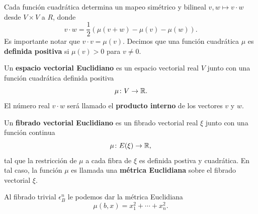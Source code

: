 Cada función cuadrática determina un mapeo simétrico y bilineal $v,w \mapsto v \cdot w$ desde $V \times V$ a $R$, donde
\[ v \cdot w = \frac{1}{2}(\mu(v + w) - \mu(v) - \mu(w)). \]
Es importante notar que $v \cdot v = \mu(v)$. Decimos que una función cuadrática $\mu$ es \textbf{definida positiva} si $\mu(v) > 0$ para $v \neq 0$.

\begin{definition}
	Un \textbf{espacio vectorial Euclidiano} es un espacio vectorial real $V$ junto con una función cuadrática definida positiva
	\[ \mu \colon V \to \mathbb{R}. \]
	El número real $v \cdot w$ será llamado el \textbf{producto interno} de los vectores $v$ y $w$.
\end{definition}

\begin{definition}
	Un \textbf{fibrado vectorial Euclidiano} es un fibrado vectorial real $\xi$ junto con una función continua
	\[ \mu \colon E(\xi) \to \mathbb{R}, \]
	tal que la restricción de $\mu$ a cada fibra de $\xi$ es definida postiva y cuadrática. En tal caso, la función $\mu$ es llamada una \textbf{métrica Euclidiana} sobre el fibrado vectorial $\xi$.
\end{definition}

\begin{example}
	Al fibrado trivial $\epsilon_{B}^{n}$ le podemos dar la métrica Euclidiana
	\[ \mu(b,x) = x_{1}^{2} + \cdots + x_{n}^{2}. \]
\end{example}

